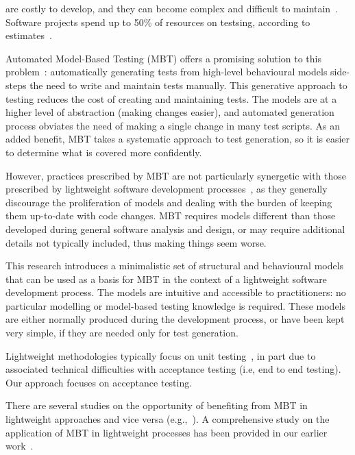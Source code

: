 %
%
\label{sec:introduction}
 are costly to develop, and they can become complex and difficult to maintain~\cite{Farago2010a}. Software
projects spend up to 50\% of resources on testsing, according to estimates~.

Automated Model-Based Testing (MBT) offers a promising solution to this problem~\cite{Tretmans2008}: automatically generating tests from high-level behavioural models side-steps the need to write and maintain tests manually.
This generative approach to testing reduces the cost of creating and maintaining tests. The models are at a higher level
of abstraction (making changes easier), and automated generation process obviates the need of making a single 
change in many test scripts. 
As an added benefit, MBT takes a systematic approach to test generation, so it is easier to determine what is covered more confidently.

However, practices prescribed by MBT are not particularly synergetic with those prescribed by lightweight software development processes~\cite{Farago2010a}, as they generally discourage the proliferation of models and dealing with the burden of 
keeping them up-to-date with code changes. 
MBT requires models different than those developed during general software analysis and design, or may require
additional details not typically included, thus making things seem worse.

This research introduces a minimalistic set of structural and behavioural models that can be used as a basis for MBT in the
context of a lightweight software development process. The models are intuitive and accessible to practitioners: no particular modelling or model-based testing knowledge is required. These models are either normally produced during the development process,
or have been kept very simple, if they are needed only for test generation.

Lightweight methodologies typically focus on unit testing~\cite{Ambler2008,Ambler}, in part due to associated technical difficulties
with acceptance testing (i.e, end to end testing). Our approach focuses on
acceptance testing.
 


There are several studies on the  opportunity of benefiting from MBT in lightweight approaches and vice versa (e.g.,~\cite{Katara2006,Farago2010b,Loffler2010,Ussami2016}). A comprehensive study on the application of MBT in lightweight processes has been provided in our earlier work~\cite{Jalalinasab2012}.


